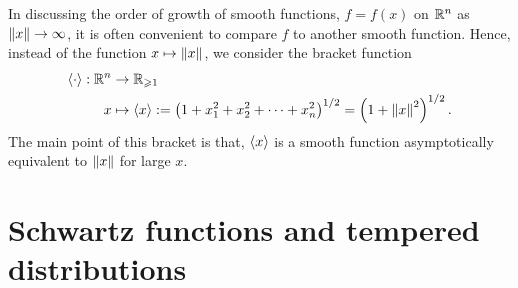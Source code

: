 \documentclass[12pt]{article}
\begin{document}
In discussing the order of growth of smooth functions, $f = f(x)$ on $\R^n$ as $\norm[x] \to \infty$, it is often convenient to compare $f$ to another smooth function. Hence, instead of the function $x \mapsto \norm[x]$, we consider the bracket function 
\begin{align*}
\sym[\cdot] : \R^n &\to \R_{\geq 1} \\
x &\mapsto \sym[x] := \brac{ 1 + x_1^2 + x_2^2 + \dots + x_n^2}^{1/2} = \brac{1 + \norm[x]^2}^{1/2}. 
\end{align*}
The main point of this bracket is that,  $\sym[x]$ is a smooth function asymptotically equivalent to $\norm[x]$ for large $x$. 


\section{Schwartz functions and tempered distributions}
\end{document}

